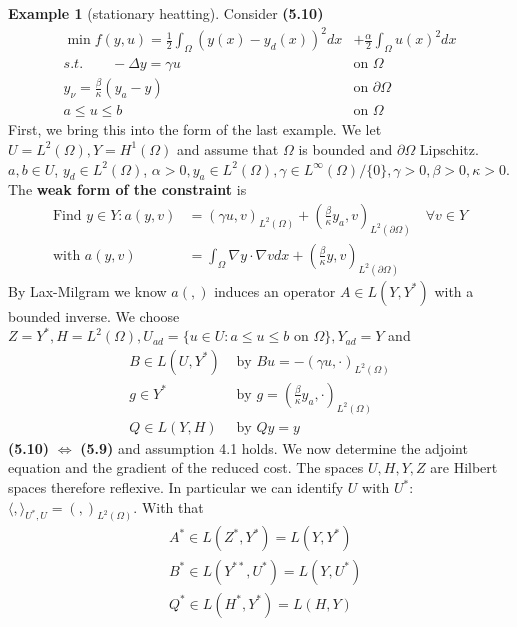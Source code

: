 \documentclass[a4paper,11pt,fleqn]{book}
\theoremstyle{definition}
\newtheorem*{example}{Example}
\theoremstyle{remark}
\begin{document}
\begin{example}[stationary heatting]
	Consider \textbf{(5.10)}
	\begin{align*}
		\min f(y, u) = \frac{1}{2}\int_\Omega (y(x) - y_d(x))^2 dx 
		&+ \frac{\alpha}{2} \int_\Omega u(x)^2 dx \\
		s.t.\qquad - \Delta y = \gamma u \quad &\text{on } \Omega \\
		y_\nu = \frac{\beta}{\kappa}(y_a - y) \quad &\text{on } \partial \Omega\\
		a \le u \le b \quad &\text{on }  \Omega
	\end{align*}
	First, we bring this into the form of the last example. We let $U = L^2(\Omega), Y = H^1(\Omega)$ and assume that $\Omega$ is bounded and $\partial \Omega$ Lipschitz. $a, b \in U$, $y_d \in L^2(\Omega)$, $\alpha > 0, y_a \in L^2(\Omega), \gamma \in L^\infty(\Omega) \slash \{0\}, \gamma > 0, \beta > 0, \kappa > 0$. \\
	The \textbf{weak form of the constraint} is 
	\begin{align*}
		\text{Find } y \in Y: a(y, v) &= (\gamma u,  v)_{L^2(\Omega)} 
		+ (\frac{\beta}{\kappa} y_a, v)_{L^2(\partial \Omega)} \quad \forall v \in Y \\
		\text{with } 
		a(y, v) &= \int_\Omega \nabla y \cdot \nabla v dx + (\frac{\beta}{\kappa}y, v)_{L^2(\partial\Omega)}
	\end{align*}
	By Lax-Milgram we know $a( , )$ induces an operator $A \in L(Y, Y^*)$ with a bounded inverse. We choose $Z = Y^*, H = L^2(\Omega), U_{ad} = \{u \in U: a \le u \le b \text{ on } \Omega\}, Y_{ad} = Y$ and
	\begin{align*}
		B \in L(U, Y^*) &\text{ by } Bu = -(\gamma u, \cdot)_{L^2(\Omega)} \\
		g \in Y^* &\text{ by } g = (\frac{\beta}{\kappa} y_a, \cdot)_{L^2(\Omega)}\\
		Q\in L(Y, H) &\text{ by } Qy = y
	\end{align*}
	\textbf{(5.10)} $\Leftrightarrow$ \textbf{(5.9)} and assumption 4.1 holds. We now determine the adjoint equation and the gradient of the reduced cost. The spaces $U, H, Y, Z$ are Hilbert spaces therefore reflexive. In particular we can identify $U$ with $U^*$: $\langle , \rangle_{U^*, U} = (, )_{L^2(\Omega)}$. With that 
	\begin{align*}
		&A^* \in L(Z^*, Y^*) = L(Y, Y^*)\\
		&B^* \in L(Y^{**}, U^*) = L(Y, U^*)\\
		&Q^* \in L(H^*, Y^*) = L(H, Y)
	\end{align*}

\end{example}
\end{document}
